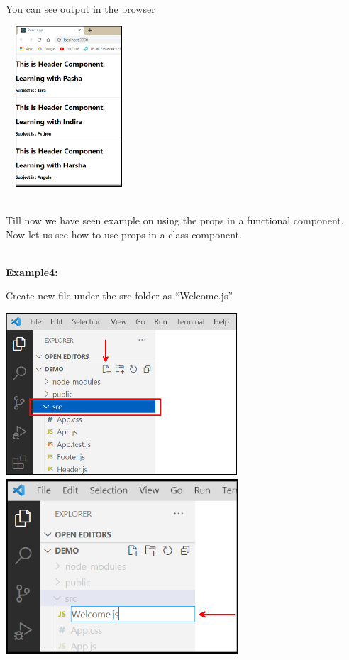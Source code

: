 \documentclass{article}
\begin{document}
\noindent\\
You can see output in the browser

\begin{center}
	\noindent \includegraphics*[width=1.85in, height=2.36in]{IMG-08-12}
\end{center}

\noindent \\
Till now we have seen example on using the props in a functional component. Now let us see how to use props in a class component.

\noindent 
\newpage
\noindent \\
\textbf{Example4:}

\noindent 
Create new file under the src folder as ``Welcome.js''

\begin{center}
	\noindent \includegraphics*[width=3.40in, height=2.39in]{IMG-08-13} 
	\noindent \includegraphics*[width=3.41in, height=2.57in]{IMG-08-14}
\end{center}
\end{document}
